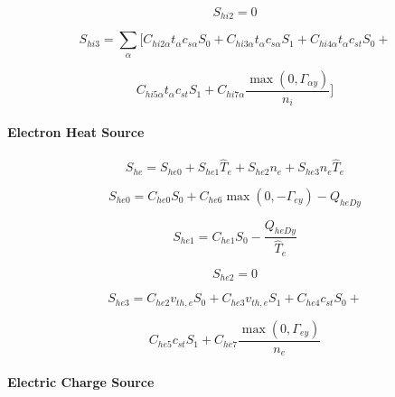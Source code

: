 \documentclass[11pt]{article}
\begin{document}
\begin{equation}
S_{hi2}=0   \label{55}
\end{equation}

\begin{equation*}
S_{hi3}=\sum_{\alpha}[C_{hi2\alpha}t_{\alpha}c_{s\alpha}S_{0}+C_{hi3\alpha
}t_{\alpha}c_{s\alpha}S_{1}+C_{hi4\alpha}t_{\alpha}c_{st}S_{0}+ 
\end{equation*}

\begin{equation}
C_{hi5\alpha}t_{\alpha}c_{st}S_{1}+C_{hi7\alpha}\frac{\max\left(
0,\Gamma_{\alpha y}\right) }{n_{i}}]   \label{56}
\end{equation}

\bigskip

\paragraph{Electron Heat Source}

\begin{equation}
S_{he}=S_{he0}+S_{he1}\widehat{T}_{e}+S_{he2}n_{e}+S_{he3}n_{e}\widehat{T}%
_{e}   \label{57}
\end{equation}

\begin{equation}
S_{he0}=C_{he0}S_{0}+C_{he6}\max\left( 0,-\Gamma_{ey}\right) -Q_{heDy} 
\label{58}
\end{equation}

\begin{equation}
S_{he1}=C_{he1}S_{0}-\frac{Q_{heDy}}{\widehat{T}_{e}}   \label{59}
\end{equation}

\begin{equation}
S_{he2}=0   \label{60}
\end{equation}

\begin{equation*}
S_{he3}=C_{he2}v_{th,e}S_{0}+C_{he3}v_{th,e}S_{1}+C_{he4}c_{st}S_{0}+ 
\end{equation*}

\begin{equation}
C_{he5}c_{st}S_{1}+C_{he7}\frac{\max\left( 0,\Gamma_{ey}\right) }{n_{e}} 
\label{61}
\end{equation}

\bigskip

\paragraph{Electric Charge Source}
\end{document}
